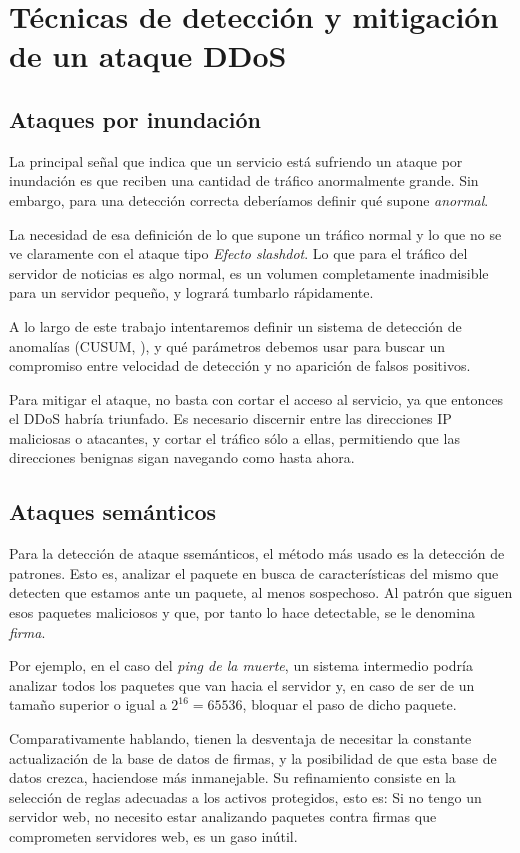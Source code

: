 \section{Técnicas de detección y mitigación de un ataque DDoS}
\subsection{Ataques por inundación}
La principal señal que indica que un servicio está sufriendo un ataque por inundación es que reciben una cantidad de 
tráfico anormalmente grande. Sin embargo, para una detección correcta deberíamos definir qué supone \emph{anormal}. 

La necesidad de esa definición de lo que supone un tráfico normal y lo que no se ve claramente con el ataque tipo 
\emph{Efecto slashdot}. Lo que para el tráfico del servidor de noticias es algo normal, es un volumen completamente 
inadmisible para un servidor pequeño, y logrará tumbarlo rápidamente.

A lo largo de este trabajo intentaremos definir un sistema de detección de anomalías (CUSUM, ), y 
qué parámetros debemos usar para buscar un compromiso entre velocidad de detección y no aparición de falsos positivos.

Para mitigar el ataque, no basta con cortar el acceso al servicio, ya que entonces el \gls{DDoS} habría triunfado. Es 
necesario discernir entre las direcciones IP maliciosas o atacantes, y cortar el tráfico sólo a ellas, permitiendo que 
las direcciones benignas sigan navegando como hasta ahora.

\subsection{Ataques semánticos}
Para la detección de ataque ssemánticos, el método más usado es la detección de patrones. Esto es, analizar el paquete 
en busca de características del mismo que detecten que estamos ante un paquete, al menos sospechoso. Al patrón que 
siguen esos paquetes maliciosos y que, por tanto lo hace detectable, se le denomina \emph{firma}.

Por ejemplo, en el caso del \emph{ping de la muerte}, un sistema intermedio podría analizar todos los paquetes que van 
hacia el servidor y, en caso de ser de un tamaño superior o igual a $2^16=65536$, bloquar el paso de dicho paquete.

Comparativamente hablando, tienen la desventaja de necesitar la constante actualización de la base de datos de firmas, 
y la posibilidad de que esta base de datos crezca, haciendose más inmanejable. Su refinamiento consiste en la selección 
de reglas adecuadas a los activos protegidos, esto es: Si no tengo un servidor web, no necesito estar analizando 
paquetes contra firmas que comprometen servidores web, es un gaso inútil.

